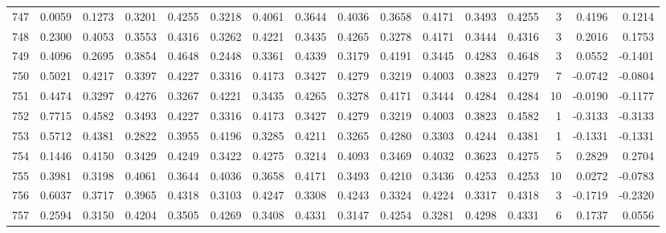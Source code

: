 \begin{tabular}{lrrrrrrrrrrrrrrr}
747 &      0.0059 &  0.1273 &  0.3201 &  0.4255 &  0.3218 &  0.4061 &  0.3644 &  0.4036 &  0.3658 &  0.4171 &   0.3493 &     0.4255 &      3 &                    0.4196 &                     0.1214 \\
748 &      0.2300 &  0.4053 &  0.3553 &  0.4316 &  0.3262 &  0.4221 &  0.3435 &  0.4265 &  0.3278 &  0.4171 &   0.3444 &     0.4316 &      3 &                    0.2016 &                     0.1753 \\
749 &      0.4096 &  0.2695 &  0.3854 &  0.4648 &  0.2448 &  0.3361 &  0.4339 &  0.3179 &  0.4191 &  0.3445 &   0.4283 &     0.4648 &      3 &                    0.0552 &                    -0.1401 \\
750 &      0.5021 &  0.4217 &  0.3397 &  0.4227 &  0.3316 &  0.4173 &  0.3427 &  0.4279 &  0.3219 &  0.4003 &   0.3823 &     0.4279 &      7 &                   -0.0742 &                    -0.0804 \\
751 &      0.4474 &  0.3297 &  0.4276 &  0.3267 &  0.4221 &  0.3435 &  0.4265 &  0.3278 &  0.4171 &  0.3444 &   0.4284 &     0.4284 &     10 &                   -0.0190 &                    -0.1177 \\
752 &      0.7715 &  0.4582 &  0.3493 &  0.4227 &  0.3316 &  0.4173 &  0.3427 &  0.4279 &  0.3219 &  0.4003 &   0.3823 &     0.4582 &      1 &                   -0.3133 &                    -0.3133 \\
753 &      0.5712 &  0.4381 &  0.2822 &  0.3955 &  0.4196 &  0.3285 &  0.4211 &  0.3265 &  0.4280 &  0.3303 &   0.4244 &     0.4381 &      1 &                   -0.1331 &                    -0.1331 \\
754 &      0.1446 &  0.4150 &  0.3429 &  0.4249 &  0.3422 &  0.4275 &  0.3214 &  0.4093 &  0.3469 &  0.4032 &   0.3623 &     0.4275 &      5 &                    0.2829 &                     0.2704 \\
755 &      0.3981 &  0.3198 &  0.4061 &  0.3644 &  0.4036 &  0.3658 &  0.4171 &  0.3493 &  0.4210 &  0.3436 &   0.4253 &     0.4253 &     10 &                    0.0272 &                    -0.0783 \\
756 &      0.6037 &  0.3717 &  0.3965 &  0.4318 &  0.3103 &  0.4247 &  0.3308 &  0.4243 &  0.3324 &  0.4224 &   0.3317 &     0.4318 &      3 &                   -0.1719 &                    -0.2320 \\
757 &      0.2594 &  0.3150 &  0.4204 &  0.3505 &  0.4269 &  0.3408 &  0.4331 &  0.3147 &  0.4254 &  0.3281 &   0.4298 &     0.4331 &      6 &                    0.1737 &                     0.0556 \\

\end{tabular}
